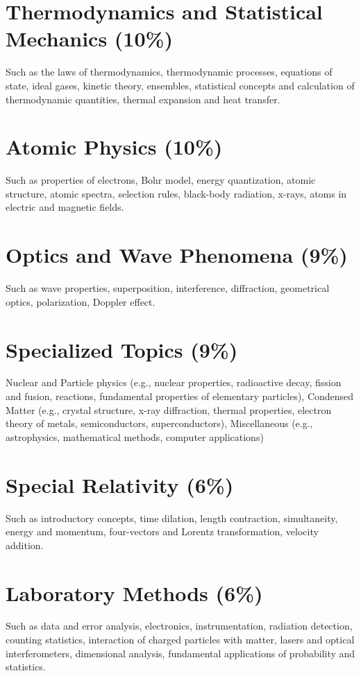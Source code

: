 \documentclass[%
 reprint,
superscriptaddress,
 amsmath,amssymb,
 aps,
prc,
]{revtex4-1}
\begin{document}
\section{Thermodynamics and Statistical Mechanics (10\%)}
Such as the laws of thermodynamics, thermodynamic processes, equations of state, ideal gases, kinetic theory, ensembles, statistical concepts and calculation of thermodynamic quantities, thermal expansion and heat transfer.

\section{Atomic Physics (10\%)}
Such as properties of electrons, Bohr model, energy quantization, atomic structure, atomic spectra, selection rules, black-body radiation, x-rays, atoms in electric and magnetic fields.

\section{Optics and Wave Phenomena (9\%)}
Such as wave properties, superposition, interference, diffraction, geometrical optics, polarization, Doppler effect.

\section{Specialized Topics (9\%)}
Nuclear and Particle physics (e.g., nuclear properties, radioactive decay, fission and fusion, reactions, fundamental properties of elementary particles), Condensed Matter (e.g., crystal structure, x-ray diffraction, thermal properties, electron theory of metals, semiconductors, superconductors), Miscellaneous (e.g., astrophysics, mathematical methods, computer applications)

\section{Special Relativity (6\%)}
Such as introductory concepts, time dilation, length contraction, simultaneity, energy and momentum, four-vectors and Lorentz transformation, velocity addition.

\section{Laboratory Methods (6\%)}
Such as data and error analysis, electronics, instrumentation, radiation detection, counting statistics, interaction of charged particles with matter, lasers and optical interferometers, dimensional analysis, fundamental applications of probability and statistics.
\end{document}
